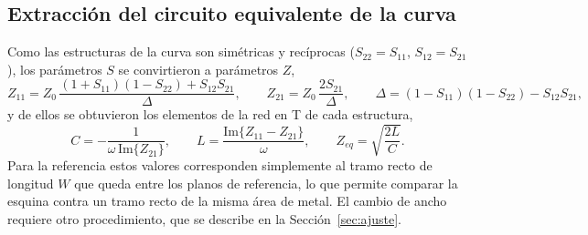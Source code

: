 \subsection{Extracción del circuito equivalente de la curva}
\label{sec:extraccion}
Como las estructuras de la curva son simétricas y recíprocas ($S_{22}=S_{11}$, $S_{12}=S_{21}$), los parámetros $S$ se convirtieron a parámetros $Z$,
\begin{equation}
Z_{11} = Z_0\,\frac{(1+S_{11})(1-S_{22})+S_{12}S_{21}}{\Delta}, \qquad
Z_{21} = Z_0\,\frac{2S_{21}}{\Delta}, \qquad
\Delta = (1-S_{11})(1-S_{22})-S_{12}S_{21},
\label{eq:zparam}
\end{equation}
y de ellos se obtuvieron los elementos de la red en T de cada estructura,
\begin{equation}
C = -\frac{1}{\omega\,\mathrm{Im}\{Z_{21}\}}, \qquad
L = \frac{\mathrm{Im}\{Z_{11}-Z_{21}\}}{\omega}, \qquad
Z_{eq} = \sqrt{\frac{2L}{C}}.
\label{eq:LC}
\end{equation}
Para la referencia estos valores corresponden simplemente al tramo recto de longitud $W$ que queda entre los planos de referencia, lo que permite comparar la esquina contra un tramo recto de la misma área de metal. El cambio de ancho requiere otro procedimiento, que se describe en la Sección~\ref{sec:ajuste}.

